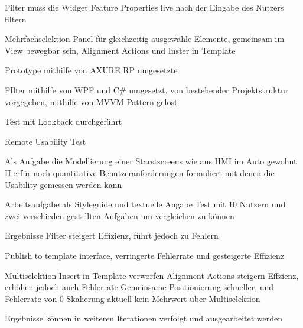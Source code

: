 	Filter muss die Widget Feature Properties live nach der Eingabe des Nutzers filtern

	Mehrfachselektion
		Panel für gleichzeitig ausgewähle Elemente, gemeinsam im View bewegbar sein, Alignment Actions und Inster in Template

	Prototype mithilfe von AXURE RP umgesetzte

	FIlter mithilfe von WPF und C\# umgesetzt, von bestehender Projektstruktur vorgegeben, mithilfe von MVVM Pattern gelöst

Test mit Lookback durchgeführt
	
	Remote Usability Test

	Als Aufgabe die Modellierung einer Starstscreens wie aus HMI im Auto gewohnt
		Hierfür noch quantitative Benutzeranforderungen formuliert mit denen die Usability gemessen werden kann

	Arbeitsaufgabe als Styleguide und textuelle Angabe
		Test mit 10 Nutzern und zwei verschieden gestellten Aufgaben um vergleichen zu können

Ergebnisse
	Filter steigert Effizienz, führt jedoch zu Fehlern

	Publish to template interface, verringerte Fehlerrate und gesteigerte Effizienz

	Multiselektion
		Insert in Template verworfen
		Alignment Actions steigern Effzienz, erhöhen jedoch auch Fehlerrate
		Gemeinsame Positionierung schneller, und Fehlerrate von 0
		Skalierung aktuell kein Mehrwert über Multiselektion


Ergebnisse können in weiteren Iterationen verfolgt und ausgearbeitet werden
		
	

	
			
		
